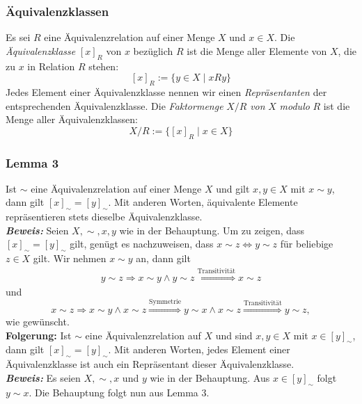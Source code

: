 \subsubsection{Äquivalenzklassen}%
\label{ssub:äquivalenzklassen}
Es sei $R$ eine Äquivalenzrelation auf einer Menge $X$ und $x\in X$. Die \textit{Äquivalenzklasse} $[x]_R$ von $x$ bezüglich $R$ ist die Menge aller Elemente von $X$, die zu $x$ in Relation $R$ stehen:
    \[
    [x]_R:=\{y\in X\mid xRy \}
    \]
    Jedes Element einer Äquivalenzklasse nennen wir einen \textit{Repräsentanten} der entsprechenden Äquivalenzklasse.
    Die \textit{Faktormenge} $X/R$ \textit{von} $X$ \textit{modulo} $R$ ist die Menge aller Äquivalenzklassen:
    \[
    X/R:=\big\{ [x]_R\mid x\in X \big\}
    \]

\subsubsection{Lemma 3}%
\label{ssub:lemma_3}
Ist $\sim $ eine Äquivalenzrelation auf einer Menge $X$ und gilt $x,y\in X$ mit $x\sim y$, dann gilt $[x]_\sim=[y]_\sim$. Mit anderen Worten, äquivalente Elemente repräsentieren stets dieselbe Äquivalenzklasse. \\
\textbf{\textit{Beweis: }} 
Seien $X,\sim,x,y$ wie in der Behauptung. Um zu zeigen, dass $[x]_\sim=[y]_\sim$ gilt, genügt es nachzuweisen, dass $x\sim z\Leftrightarrow y\sim z$ für beliebige $z\in X$ gilt. Wir nehmen $x\sim y$ an, dann gilt
    \begin{align*}
    y\sim z\Rightarrow x\sim y\land y\sim z \stackrel{\text{Transitivität}}{\Longrightarrow} x\sim z
    \end{align*}
    und
    \[
    x\sim z\Rightarrow x\sim y\land x\sim z\stackrel{\text{Symmetrie}}{\Longrightarrow} y\sim x\land x\sim z\stackrel{\text{Transitivität}}{\Longrightarrow} y\sim z,
    \]
    wie gewünscht. \\
\textbf{Folgerung: } 
Ist $\sim $ eine Äquivalenzrelation auf $X$ und sind $x,y\in X$ mit $x\in[y]_\sim$, dann gilt $[x]_\sim=[y]_\sim$. Mit anderen Worten, jedes Element einer Äquivalenzklasse ist auch ein Repräsentant dieser Äquivalenzklasse. \\
\textbf{\textit{Beweis: }}
Es seien $X,\sim,x$ und $y$ wie in der Behauptung. Aus $x\in[y]_\sim$ folgt $y\sim x$. Die Behauptung folgt nun aus Lemma 3.

